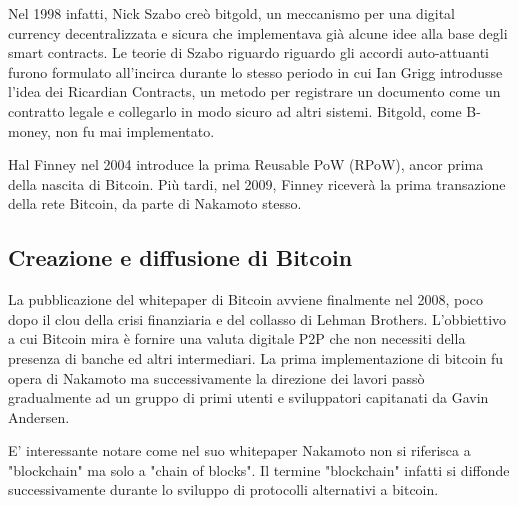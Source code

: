 Nel 1998 infatti, Nick Szabo creò bitgold\cite{K14}, un meccanismo per una digital currency decentralizzata e sicura che implementava già alcune idee alla base degli smart contracts. Le teorie di Szabo riguardo riguardo gli accordi auto-attuanti furono formulato all'incirca durante lo stesso periodo in cui Ian Grigg introdusse l'idea dei Ricardian Contracts, un metodo per registrare un documento come un contratto legale e collegarlo in modo sicuro ad altri sistemi\cite{K15}. Bitgold, come B-money, non fu mai implementato.
 
Hal Finney nel 2004 introduce la prima Reusable PoW (RPoW), ancor prima della nascita di Bitcoin. Più tardi, nel 2009, Finney riceverà la prima transazione della rete Bitcoin, da parte di Nakamoto stesso. 

\subsection{Creazione e diffusione di Bitcoin}

La pubblicazione del whitepaper di Bitcoin avviene finalmente nel 2008, poco dopo il clou della crisi finanziaria e del collasso di Lehman Brothers. L'obbiettivo a cui Bitcoin mira è fornire una valuta digitale P2P che non necessiti della presenza di banche ed altri intermediari.  La prima implementazione di bitcoin fu opera di Nakamoto ma successivamente la direzione dei lavori passò gradualmente ad un gruppo di primi utenti e sviluppatori capitanati da Gavin Andersen. 

E' interessante notare come nel suo whitepaper\cite{K1} Nakamoto non si riferisca a "blockchain" ma solo a "chain of blocks". Il termine "blockchain" infatti si diffonde successivamente durante lo sviluppo di protocolli alternativi a bitcoin. 

